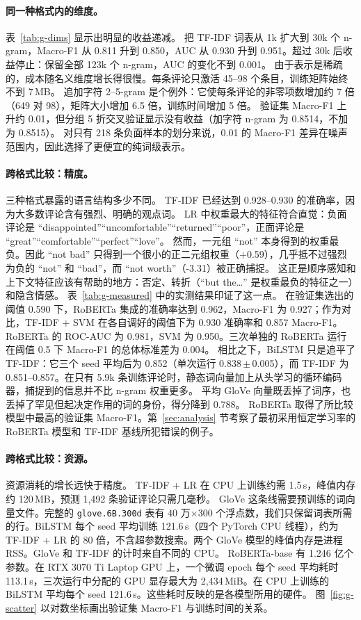 \documentclass[11pt,a4paper]{article}
\begin{document}
\paragraph{同一种格式内的维度。}
表~\ref{tab:g-dims} 显示出明显的收益递减。
把 TF-IDF 词表从 1k 扩大到 30k 个 n-gram，Macro-F1 从 0.811 升到 0.850，AUC 从 0.930 升到 0.951。超过 30k 后收益停止：保留全部 123k 个 n-gram，AUC 的变化不到 0.001。
由于表示是稀疏的，成本随名义维度增长得很慢。每条评论只激活 45--98 个条目，训练矩阵始终不到 7\,MB。
追加字符 2--5-gram 是个例外：它使每条评论的非零项数增加约 7 倍（649 对 98），矩阵大小增加 6.5 倍，训练时间增加 5 倍。
验证集 Macro-F1 上升约 0.01，但分组 5 折交叉验证显示没有收益（加字符 n-gram 为 0.8514，不加为 0.8515）。
对只有 218 条负面样本的划分来说，0.01 的 Macro-F1 差异在噪声范围内，因此选择了更便宜的纯词级表示。

\paragraph{跨格式比较：精度。}
三种格式暴露的语言结构多少不同。
TF-IDF 已经达到 0.928--0.930 的准确率，因为大多数评论含有强烈、明确的观点词。
LR 中权重最大的特征符合直觉：负面评论是 ``disappointed''``uncomfortable''``returned''``poor''，正面评论是 ``great''``comfortable''``perfect''``love''。
然而，一元组 ``not'' 本身得到的权重最负。因此 ``not bad'' 只得到一个很小的正二元组权重（+0.59），几乎抵不过强烈为负的 ``not'' 和 ``bad''，而 ``not worth''（-3.31）被正确捕捉。
这正是顺序感知和上下文特征应该有帮助的地方：否定、转折（``but the\dots'' 是权重最负的特征之一）和隐含情感。
表~\ref{tab:g-measured} 中的实测结果印证了这一点。
在验证集选出的阈值 0.590 下，RoBERTa 集成的准确率达到 0.962，Macro-F1 为 0.927；作为对比，TF-IDF + SVM 在各自调好的阈值下为 0.930 准确率和 0.857 Macro-F1。RoBERTa 的 ROC-AUC 为 0.981，SVM 为 0.950。三次单独的 RoBERTa 运行在阈值 0.5 下 Macro-F1 的总体标准差为 0.004。
相比之下，BiLSTM 只是追平了 TF-IDF：它三个 seed 平均后为 0.852（单次运行 0.838\,$\pm$\,0.005），而 TF-IDF 为 0.851--0.857。在只有 5.9k 条训练评论时，静态词向量加上从头学习的循环编码器，捕捉到的信息并不比 n-gram 权重更多。
平均 GloVe 向量既丢掉了词序，也丢掉了罕见但起决定作用的词的身份，得分降到 0.788。
RoBERTa 取得了所比较模型中最高的验证集 Macro-F1。第~\ref{sec:analysis} 节考察了最初采用恒定学习率的 RoBERTa 模型和 TF-IDF 基线所犯错误的例子。

\paragraph{跨格式比较：资源。}
资源消耗的增长远快于精度。
TF-IDF + LR 在 CPU 上训练约需 1.5\,s，峰值内存约 120\,MB，预测 1{,}492 条验证评论只需几毫秒。
GloVe 这条线需要预训练的词向量文件。完整的 \texttt{glove.6B.300d} 表有 40 万$\times$300 个浮点数，我们只保留词表所需的行。BiLSTM 每个 seed 平均训练 121.6\,s（四个 PyTorch CPU 线程），约为 TF-IDF + LR 的 80 倍，不含超参数搜索。两个 GloVe 模型的峰值内存是进程 RSS。GloVe 和 TF-IDF 的计时来自不同的 CPU。
RoBERTa-base 有 1.246 亿个参数。在 RTX 3070 Ti Laptop GPU 上，一个微调 epoch 每个 seed 平均耗时 113.1\,s，三次运行中分配的 GPU 显存最大为 2{,}434\,MiB。在 CPU 上训练的 BiLSTM 平均每个 seed 121.6\,s。这些耗时反映的是各模型所用的硬件。
图~\ref{fig:g-scatter} 以对数坐标画出验证集 Macro-F1 与训练时间的关系。
\end{document}
